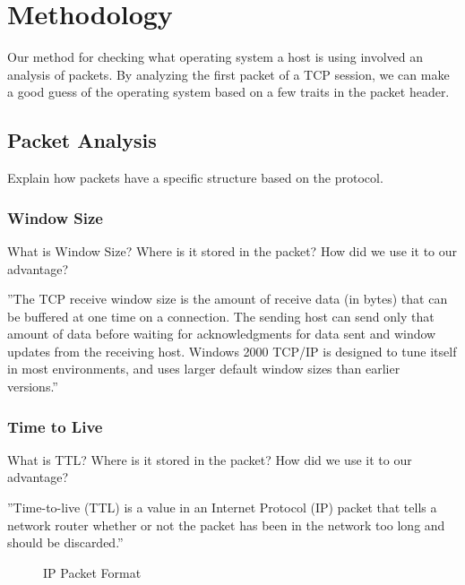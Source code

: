 
\section{Methodology}
Our method for checking what operating system a host is using involved an analysis of packets. By analyzing the first packet of a TCP session, we can make a good guess of the operating system based on a few traits in the packet header.

\subsection{Packet Analysis}
Explain how packets have a specific structure based on the protocol.

\subsubsection{Window Size}
What is Window Size? Where is it stored in the packet? How did we use it to our advantage?

''The TCP receive window size is the amount of receive data (in bytes) that can be buffered at one time on a connection. The sending host can send only that amount of data before waiting for acknowledgments for data sent and window updates from the receiving host. Windows 2000 TCP/IP is designed to tune itself in most environments, and uses larger default window sizes than earlier versions.''~\cite{Microsoft1}

\subsubsection{Time to Live}
What is TTL? Where is it stored in the packet? How did we use it to our advantage?

''Time-to-live (TTL) is a value in an Internet Protocol (IP) packet that tells a network router whether or not the packet has been in the network too long and should be discarded.'' ~\cite{Rouse07}

\begin{figure}[p]
	\caption{\label{fig:tcpDiagram} IP Packet Format~\cite{Cisco1}}
\end{figure}

